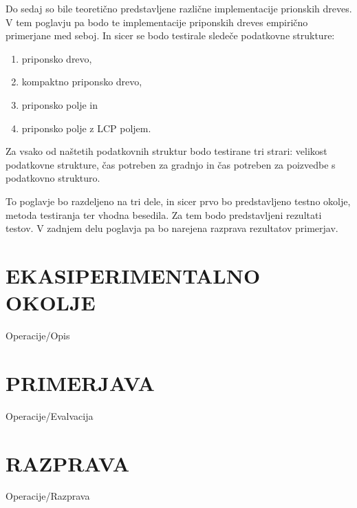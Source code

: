 Do sedaj so bile teoretično predstavljene različne implementacije prionskih dreves. V tem poglavju pa bodo te implementacije priponskih dreves empirično primerjane med seboj. In sicer se bodo testirale sledeče podatkovne strukture:
\begin{enumerate}
        \item priponsko drevo, %
        \item kompaktno priponsko drevo, 
        \item priponsko polje in 
        \item priponsko polje z LCP poljem.
\end{enumerate}
Za vsako od naštetih podatkovnih struktur bodo testirane tri strari: velikost podatkovne strukture, čas potreben za gradnjo in čas potreben za poizvedbe s podatkovno strukturo.

To poglavje bo razdeljeno na tri dele, in sicer prvo bo predstavljeno testno okolje, metoda testiranja ter vhodna besedila. Za tem bodo predstavljeni rezultati testov. V zadnjem delu poglavja pa bo narejena razprava rezultatov primerjav.

\section{EKASIPERIMENTALNO OKOLJE}\label{sec:opis}
{Operacije/Opis}


\section{PRIMERJAVA}\label{sec:primerjava}
{Operacije/Evalvacija}

\section{RAZPRAVA}\label{sec:razprava}
{Operacije/Razprava}
